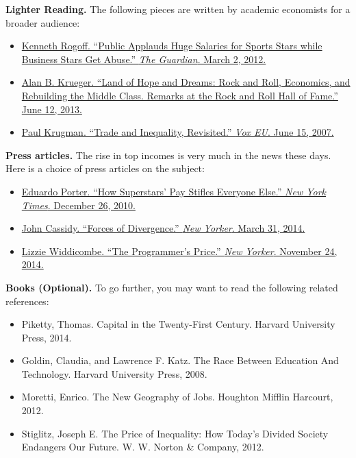 \documentclass[]{book}
\providecommand{\tightlist}{%
  \setlength{\itemsep}{0pt}\setlength{\parskip}{0pt}}
\theoremstyle{definition}
\theoremstyle{definition}
\theoremstyle{definition}
\theoremstyle{remark}
\begin{document}
\textbf{Lighter Reading.} The following pieces are written by academic
economists for a broader audience:

\begin{itemize}
\tightlist
\item
  \href{http://www.theguardian.com/business/economics-blog/2012/mar/02/public-salaries-sports-superstars-business}{Kenneth
  Rogoff. ``Public Applauds Huge Salaries for Sports Stars while
  Business Stars Get Abuse.'' \emph{The Guardian}. March 2, 2012.}
\item
  \href{https://www.whitehouse.gov/blog/2013/06/12/rock-and-roll-economics-and-rebuilding-middle-class\#fulltext}{Alan
  B. Krueger. ``Land of Hope and Dreams: Rock and Roll, Economics, and
  Rebuilding the Middle Class. Remarks at the Rock and Roll Hall of
  Fame.'' June 12, 2013.}
\item
  \href{http://www.voxeu.org/article/trade-and-inequality-revisited}{Paul
  Krugman. ``Trade and Inequality, Revisited.'' \emph{Vox EU}. June 15,
  2007.}
\end{itemize}

\textbf{Press articles.} The rise in top incomes is very much in the
news these days. Here is a choice of press articles on the subject:

\begin{itemize}
\tightlist
\item
  \href{http://www.nytimes.com/2010/12/26/business/26excerpt.html?_r=0}{Eduardo
  Porter. ``How Superstars' Pay Stifles Everyone Else.'' \emph{New York
  Times}. December 26, 2010.}
\item
  \href{http://www.newyorker.com/magazine/2014/03/31/forces-of-divergence}{John
  Cassidy. ``Forces of Divergence.'' \emph{New Yorker}. March 31, 2014.}
\item
  \href{http://www.newyorker.com/magazine/2014/11/24/programmers-price}{Lizzie
  Widdicombe. ``The Programmer's Price.'' \emph{New Yorker}. November
  24, 2014.}
\end{itemize}

\textbf{Books (Optional).} To go further, you may want to read the
following related references:

\begin{itemize}
\tightlist
\item
  Piketty, Thomas. Capital in the Twenty-First Century. Harvard
  University Press, 2014.
\item
  Goldin, Claudia, and Lawrence F. Katz. The Race Between Education And
  Technology. Harvard University Press, 2008.
\item
  Moretti, Enrico. The New Geography of Jobs. Houghton Mifflin Harcourt,
  2012.
\item
  Stiglitz, Joseph E. The Price of Inequality: How Today's Divided
  Society Endangers Our Future. W. W. Norton \& Company, 2012.
\end{itemize}
\end{document}
